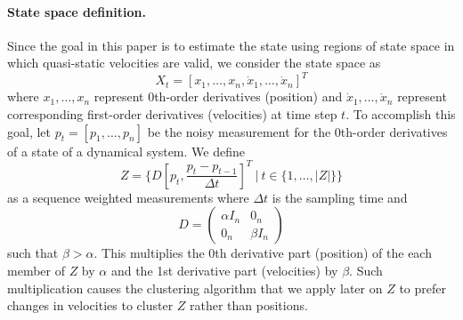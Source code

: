 \documentclass{article}
\begin{document}
\begin{multicols}{2}
    \paragraph{State space definition.} Since the goal in this paper is to estimate the state using regions of state space in which quasi-static velocities are valid, we consider the state space as 
    \begin{equation}
        X_t = [x_{1},\dots,x_{n},\dot{x}_{1},\dots,\dot{x}_{n}]^T
        \label{eq:state-space}
    \end{equation}
    where $x_1,\dots,x_n$ represent 0th-order derivatives (position) and $\dot{x}_1,\dots,\dot{x}_n$ represent corresponding first-order derivatives (velocities) at time step $t$. To accomplish this goal, let $p_t=[p_1,\dots,p_n]$ be the noisy measurement for the 0th-order derivatives of a state of a dynamical system. We define 
    \begin{equation}
        Z = \{ D[p_t, \frac{p_t-p_{t-1}}{\Delta t}]^T \ | \ t\in \{1,\dots,|Z|\}\}
        \label{eq:measurement-space}
    \end{equation}
    as a sequence weighted measurements where $\Delta t$ is the sampling time and 
    \begin{equation}
        D = 
        \begin{pmatrix}
        \alpha I_n & 0_n \\
        0_n & \beta I_n
        \end{pmatrix}
        \label{eq:weighting-matrix}
    \end{equation}
    such that $\beta > \alpha$. This multiplies the 0th derivative part (position) of the each member of $Z$ by $\alpha$ and the 1st derivative part (velocities) by $\beta$. Such multiplication causes the clustering algorithm that we apply later on $Z$ to prefer changes in velocities to cluster $Z$ rather than positions. 


\end{multicols}
\end{document}
